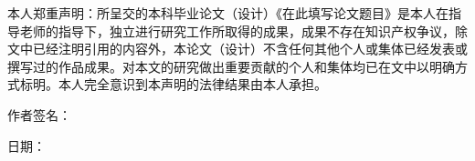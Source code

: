 
\begin{declarationzh}

本人郑重声明：所呈交的本科毕业论文（设计）《在此填写论文题目》是本人在指导老师的指导下，独立进行研究工作所取得的成果，成果不存在知识产权争议，除文中已经注明引用的内容外，本论文（设计）不含任何其他个人或集体已经发表或撰写过的作品成果。对本文的研究做出重要贡献的个人和集体均已在文中以明确方式标明。本人完全意识到本声明的法律结果由本人承担。

\vspace{30pt}
\begin{flushright}
作者签名：\underline{\hspace{4cm}}\qquad\par
日\qquad 期：\underline{\hspace{4cm}}\qquad
\end{flushright}

\end{declarationzh}
